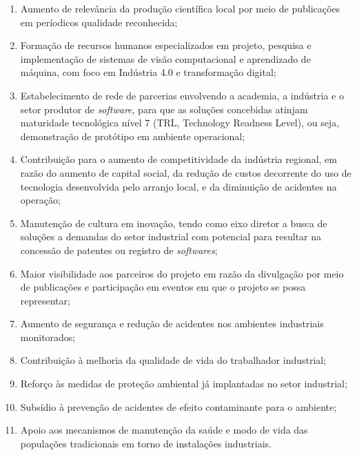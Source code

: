 \begin{enumerate}
    \item Aumento de relevância da produção científica local por meio de publicações em períodicos qualidade reconhecida;
    \item Formação de recursos humanos especializados em projeto, pesquisa e implementação de sistemas de visão computacional e aprendizado de máquina, com foco em Indústria 4.0 e transformação digital; 
    \item Estabelecimento de rede de parcerias envolvendo a academia, a indústria e o setor produtor de \emph{software}, para que as soluções concebidas atinjam maturidade tecnológica nível 7 (TRL, Technology Readness Level), ou seja, demonstração de protótipo em ambiente operacional; %
    \item Contribuição para o aumento de competitividade da indústria regional, em razão do aumento de capital social, da redução de custos decorrente do uso de tecnologia desenvolvida pelo arranjo local, e da diminuição de acidentes na operação;  
    \item Manutenção de cultura em inovação, tendo como eixo diretor a busca de soluções a demandas do setor industrial com potencial para resultar na concessão de patentes ou registro de \emph{softwares};
    \item Maior visibilidade aos parceiros do projeto em razão da divulgação por meio de publicações e participação em eventos em que o projeto se possa representar; 
    \item Aumento de segurança e redução de acidentes nos ambientes industriais monitorados;
    \item Contribuição à melhoria da qualidade de vida do trabalhador industrial;   
    \item Reforço às medidas de proteção ambiental já implantadas no setor industrial;
    \item Subsídio à prevenção de acidentes de efeito contaminante para o ambiente;
    \item Apoio aos mecanismos de manutenção da saúde e modo de vida das populações tradicionais em torno de instalações industriais.
\end{enumerate}

